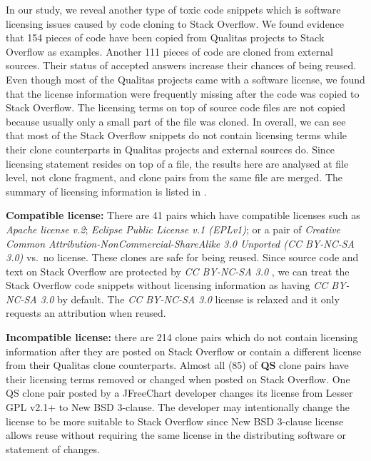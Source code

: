 \documentclass[10pt,journal,compsoc]{IEEEtran}
\begin{document}
In our study, we reveal another type of toxic code snippets which is software
licensing issues caused by code cloning to Stack Overflow. We found evidence that
154 pieces of code have been copied from Qualitas projects to Stack Overflow as
examples. Another 111 pieces of code are cloned from external sources. Their
status of accepted answers increase their chances of being reused. Even though
most of the Qualitas projects came with a software license, we found that the
license information were frequently missing after the code was copied to Stack
Overflow. The licensing terms on top of source code files are not copied because
usually only a small part of the file was cloned. In overall, we can see that
most of the Stack Overflow snippets do not contain licensing terms while their
clone counterparts in Qualitas projects and external sources do. Since licensing
statement resides on top of a file, the results here are analysed at file level,
not clone fragment, and clone pairs from the same file are merged. 
The summary of licensing information is listed in
.

\textbf{Compatible license:} There are 41 pairs which have compatible
licenses such as \emph{Apache license v.2}; \emph{Eclipse Public
	License v.1 (EPLv1)}; or a pair of \emph{Creative
	Common Attribution-NonCommercial-ShareAlike 3.0 Unported (CC
	BY-NC-SA 3.0)} vs.~no license. These clones are safe for being reused. Since source
code and text on Stack Overflow are
protected by \emph{CC BY-NC-SA 3.0}
, we can treat the Stack Overflow code snippets
without licensing information as having \emph{CC BY-NC-SA 3.0} by
default. The \emph{CC BY-NC-SA 3.0} license is relaxed and it only
requests an attribution when reused.

\textbf{Incompatible license:} there are 214 clone pairs which do not contain
licensing information after they are posted on Stack Overflow or contain a
different license from their Qualitas clone counterparts. Almost all (85) of
\textbf{QS} clone pairs have their licensing terms removed or changed when
posted on Stack Overflow. One QS clone pair posted by a JFreeChart developer
changes its license from Lesser GPL v2.1+ to New BSD 3-clause. The
developer may intentionally change the license to be more suitable to Stack
Overflow since New BSD 3-clause license allows reuse without requiring the same
license in the distributing software or statement of changes. 
\end{document}
